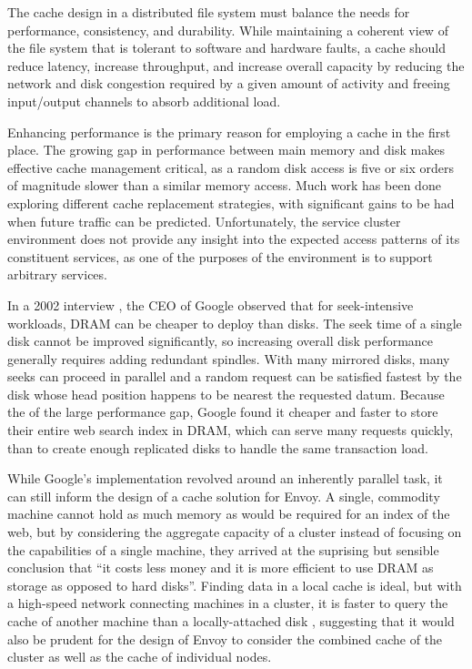 The cache design in a distributed file system must balance the needs for performance, consistency, and durability. While maintaining a coherent view of the file system that is tolerant to software and hardware faults, a cache should reduce latency, increase throughput, and increase overall capacity by reducing the network and disk congestion required by a given amount of activity and freeing input/output channels to absorb additional load.

Enhancing performance is the primary reason for employing a cache in the first place. The growing gap in performance between main memory and disk makes effective cache management critical, as a random disk access is five or six orders of magnitude slower than a similar memory access. Much work has been done exploring different cache replacement strategies, with significant gains to be had when future traffic can be predicted. Unfortunately, the service cluster environment does not provide any insight into the expected access patterns of its constituent services, as one of the purposes of the environment is to support arbitrary services.

In a 2002 interview \cite{spring}, the CEO of Google observed that for seek-intensive workloads, DRAM can be cheaper to deploy than disks. The seek time of a single disk cannot be improved significantly, so increasing overall disk performance generally requires adding redundant spindles. With many mirrored disks, many seeks can proceed in parallel and a random request can be satisfied fastest by the disk whose head position happens to be nearest the requested datum. Because the of the large performance gap, Google found it cheaper and faster to store their entire web search index in DRAM, which can serve many requests quickly, than to create enough replicated disks to handle the same transaction load.

While Google's implementation revolved around an inherently parallel task, it can still inform the design of a cache solution for Envoy. A single, commodity machine cannot hold as much memory as would be required for an index of the web, but by considering the aggregate capacity of a cluster instead of focusing on the capabilities of a single machine, they arrived at the suprising but sensible conclusion that ``it costs less money and it is more efficient to use DRAM as storage as opposed to hard disks''. Finding data in a local cache is ideal, but with a high-speed network connecting machines in a cluster, it is faster to query the cache of another machine than a locally-attached disk \cite{dahlin94b}, suggesting that it would also be prudent for the design of Envoy to consider the combined cache of the cluster as well as the cache of individual nodes.

